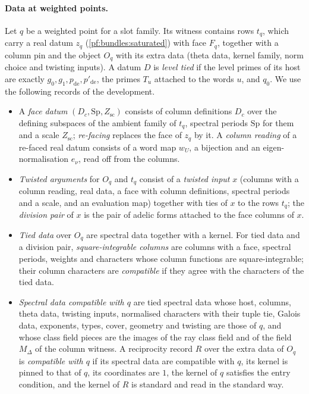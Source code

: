 \paragraph{Data at weighted points.}
Let $q$ be a weighted point for a slot family. Its witness contains rows $t_q$, which carry a real datum $z_q$ (\cref{pf:bundles:saturated})
with face $F_q$, together with a column pin and the object $O_q$ with its extra data (theta data, kernel family, norm choice and twisting
inputs). A datum $D$ is \emph{level tied} if the level primes of its host are exactly $g_0,g_1,p_{\mathrm{de}},p'_{\mathrm{de}}$, the
primes $T_u$ attached to the words $u$, and $q_0$. We use the following records of the development.
\begin{itemize}
\item A \emph{face datum} $(D_c,\mathrm{Sp},Z_{\mathrm{sc}})$ consists of column definitions $D_c$ over the defining subspaces of the
ambient family of $t_q$, spectral periods $\mathrm{Sp}$ for them and a scale $Z_{\mathrm{sc}}$; \emph{re-facing} replaces the face of $z_q$
by it. A \emph{column reading} of a re-faced real datum consists of a word map $w_U$, a bijection and an eigen-normalisation $e_\nu$, read
off from the columns.
\item \emph{Twisted arguments} for $O_q$ and $t_q$ consist of a \emph{twisted input} $x$ (columns with a column reading, real data, a face
with column definitions, spectral periods and a scale, and an evaluation map) together with ties of $x$ to the rows $t_q$; the \emph{division
pair} of $x$ is the pair of adelic forms attached to the face columns of $x$.
\item \emph{Tied data} over $O_q$ are spectral data together with a kernel. For tied data and a division pair, \emph{square-integrable columns}
are columns with a face, spectral periods, weights and characters whose column functions are square-integrable; their column characters are
\emph{compatible} if they agree with the characters of the tied data.
\item \emph{Spectral data compatible with $q$} are tied spectral data whose host, columns, theta data, twisting inputs, normalised characters
with their tuple tie, Galois data, exponents, types, cover, geometry and twisting are those of $q$, and whose class field pieces are the images
of the ray class field and of the field $M_\Delta$ of the column witness. A reciprocity record $R$ over the extra data of $O_q$ is
\emph{compatible with $q$} if its spectral data are compatible with $q$, its kernel is pinned to that of $q$, its coordinates are $1$, the
kernel of $q$ satisfies the entry condition, and the kernel of $R$ is standard and read in the standard way.
\end{itemize}

